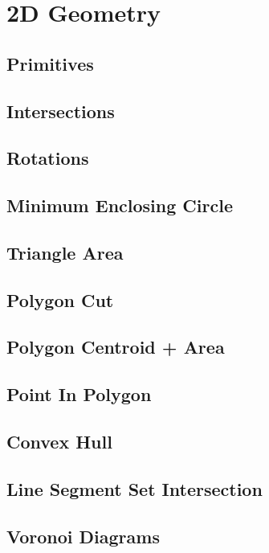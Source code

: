 \section{2D Geometry}
		\subsection{Primitives}
			
		\subsection{Intersections}
			
		\subsection{Rotations}
			
		\subsection{Minimum Enclosing Circle}
			
		\subsection{Triangle Area}
			
		\subsection{Polygon Cut}
			
		\subsection{Polygon Centroid + Area}
			
		\subsection{Point In Polygon}
			
		\subsection{Convex Hull}
			
		\subsection{Line Segment Set Intersection}
			
		\subsection{Voronoi Diagrams}
			
